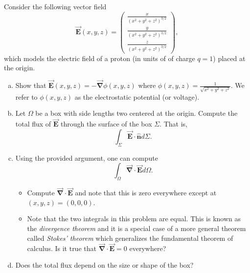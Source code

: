 \documentclass[12pt]{article} %
\newcommand{\grad}{\boldsymbol{\vec{\nabla}}}
\newcommand{\vecfieldE}{\boldsymbol{\vec{E}}}
\newcommand{\unitvec}{\boldsymbol{\hat{n}}}
\begin{document}
\begin{problem}
Consider the following vector field
\[
\vecfieldE(x,y,z) = \begin{pmatrix} \frac{x}{(x^2+y^2+z^2)^{3/2}} \\ \frac{y}{(x^2+y^2+z^2)^{3/2}} \\ \frac{z}{(x^2+y^2+z^2)^{3/2}} \end{pmatrix},
\]
which models the electric field of a proton (in units of of charge $q=1$) placed at the origin.
\begin{enumerate}[(a)]
	\item Show that $\vecfieldE(x,y,z) = - \grad \phi(x,y,z)$ where $\phi(x,y,z) = \frac{1}{\sqrt{x^2+y^2+z^2}}$.  We refer to $\phi(x,y,z)$ as the electrostatic potential (or voltage).
	\item Let $\Omega$ be a box with side lengths two centered at the origin.  Compute the total flux of $\vecfieldE$ through the surface of the box $\Sigma$. That is,
	\[
	\int_\Sigma \vecfieldE \cdot \unitvec d\Sigma.
	\]
	\item Using the provided argument, one can compute
	\[
	\int_\Omega \grad \cdot \vecfieldE d\Omega.
	\]
	\begin{itemize}
		\item Compute $\grad \cdot \vecfieldE$ and note that this is zero everywhere except at $(x,y,z)=(0,0,0)$.
		\item Note that the two integrals in this problem are equal. This is known as the \emph{divergence theorem} and it is a special case of a more general theorem called \emph{Stokes' theorem} which generalizes the fundamental theorem of calculus. Is it true that $\grad \cdot \vecfieldE = 0$ everywhere?
	\end{itemize}
	\item Does the total flux depend on the size or shape of the box?
\end{enumerate}
\end{problem}
\end{document}
